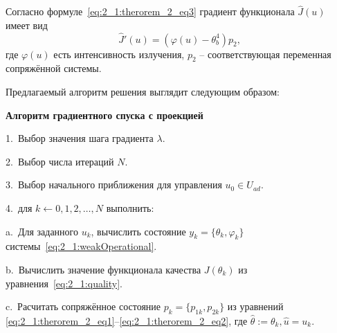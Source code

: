 Согласно формуле~\eqref{eq:2_1:therorem_2_eq3}
градиент функционала $\hat{J}(u)$~\cite{Grenkin2016a} имеет вид
\[
    \hat{J}'(u)= (\varphi(u) -\theta_b^4)p_2,
\]
где $\varphi(u)$ есть интенсивность излучения,
$p_2$ -- соответствующая переменная сопряжённой системы.

Предлагаемый алгоритм решения выглядит следующим образом:


\textbf{Алгоритм градиентного спуска с проекцией}

1.\ Выбор значения шага градиента $\lambda$.

2.\ Выбор числа итераций $N$.

3.\ Выбор начального приближения для управления $u_0 \in U_{ad}$.

4.\ для $k \leftarrow 0,1,2, \ldots, N$ выполнить:

\hspace{1cm} a.\ Для заданного $u_{k}$, вычислить состояние $y_k = \{\theta_k, \varphi_k\}$
системы~\eqref{eq:2_1:weakOperational}.

\hspace{1cm} b.\ Вычислить значение функционала качества
$J(\theta_k)$ из уравнения~\eqref{eq:2_1:quality}.

\hspace{1cm} c.\ Расчитать сопряжённое состояние $p_k=\{p_{1k},p_{2k}\}$ из
уравнений \eqref{eq:2_1:therorem_2_eq1}--\eqref{eq:2_1:therorem_2_eq2},
где $ \hat{\theta} := \theta_k, \hat{u}=u_k$.

